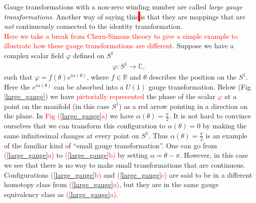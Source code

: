     Gauge transformations with a non-zero winding number are called \textit{large gauge transformations}. Another way of saying this\colorbox{red}{ } is that they are mappings that are \textit{not} continuously connected to the identity transformation. \\
    \indent \textcolor{red}{Here we take a break from Chern-Simons theory to give a simple example to illustrate how these gauge transformations are different.} Suppose we have a complex scalar field $\varphi$ defined on  $S^1$
    \begin{align}
        \varphi: S^1 \rightarrow \mathbb{C},
    \end{align}
    such that $\varphi = f(\theta) e^{i \alpha(\theta)}$, where $f\in \mathbb{R}$ and $\theta$ describes the position on the $S^1$. Here the $e ^{i \alpha (\theta)}$ can be absorbed into a $U(1)$ gauge transformation. Below (Fig \ref{large_gauge}) we have \textcolor{red}{pictorially represented} the phase of the scalar \textcolor{red}{$\varphi$} at a point on the manifold (in this case $S^1$) as a red arrow pointing in a direction on the plane. In \textcolor{red}{Fig (\ref{large_gauge}a)} we have $\alpha(\theta) = \frac{\pi}{2}$. It is not hard to convince ourselves that we can transform this configuration to $\alpha(\theta) =0$ by making the same infinitesimal changes at every point on $S^1$. Thus $\alpha(\theta) = \frac{\pi}{2}$ is an example of the familiar kind of ``small gauge transformation''. One can go from \textcolor{red}{(\ref{large_gauge}a)} to \textcolor{red}{(\ref{large_gauge}b)} by setting $\alpha =\theta - \pi$. However, in this case we see that there is no way to make small transformations that are continuous. Configurations \textcolor{red}{(\ref{large_gauge}b)} and \textcolor{red}{(\ref{large_gauge}c)} are said to be in a different homotopy class from \textcolor{red}{(\ref{large_gauge}a)}, but they are in the same gauge equivalency class as \textcolor{red}{(\ref{large_gauge}a)}.
    


